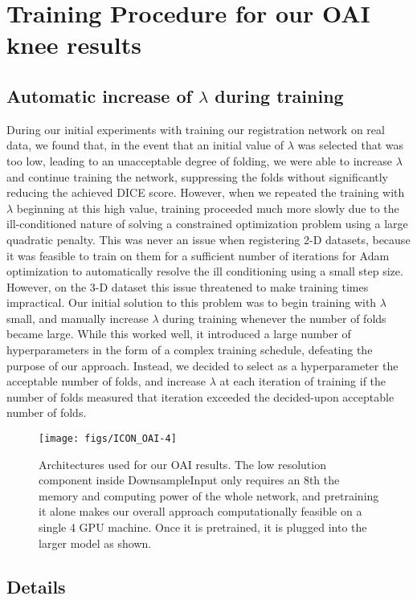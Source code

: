 \section{Training Procedure for our OAI knee results}

\subsection{Automatic increase of $\lambda$ during training}
During our initial experiments with training our registration network on real data, we found that, in the event that an initial value of $\lambda$ was selected that was too low, leading to an unacceptable degree of folding, we were able to increase $\lambda$ and continue training the network, suppressing the folds without significantly reducing the achieved DICE score. However, when we repeated the training with $\lambda$ beginning at this high value, training proceeded much more slowly due to the ill-conditioned nature of solving a constrained optimization problem using a large quadratic penalty. This was never an issue when registering 2-D datasets, because it was feasible to train on them for a sufficient number of iterations for Adam optimization to automatically resolve the ill conditioning using a small step size. However, on the 3-D dataset this issue threatened to make training times impractical.  Our initial solution to this problem was to begin training with $\lambda$ small, and manually increase $\lambda$ during training whenever the number of folds became large. While this worked well, it introduced a large number of hyperparameters in the form of a complex training schedule, defeating the purpose of our approach. Instead, we decided to select as a hyperparameter the acceptable number of folds, and increase $\lambda$ at each iteration of training if the number of folds measured that iteration exceeded the decided-upon acceptable number of folds.
\begin{figure}
    \centering
    \texttt{[image: figs/ICON\_OAI-4]}\\
    \caption{Architectures used for our OAI results. The low resolution component inside DownsampleInput only requires an 8th the memory and computing power of the whole network, and pretraining it alone makes our overall approach computationally feasible on a single 4 GPU machine. Once it is pretrained, it is plugged into the larger model as shown.}
    \label{fig:oai-arc}
\end{figure}

\subsection{Details}

